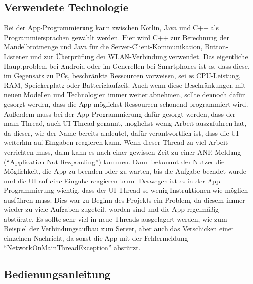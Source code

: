 \documentclass[12pt, onecolumn, notitlepage]{scrartcl}
\begin{document}
\subsection{Verwendete Technologie}
Bei der App-Programmierung kann zwischen Kotlin, Java und C++ als Programmiersprachen gewählt werden. Hier wird C++ zur Berechnung der Mandelbrotmenge und Java für die Server-Client-Kommunikation, Button-Listener und zur Überprüfung der WLAN-Verbindung verwendet. Das eigentliche Hauptproblem bei Android oder im Generellen bei Smartphones ist es, dass diese, im Gegensatz zu PCs, beschränkte Ressourcen vorweisen, sei es CPU-Leistung, RAM, Speicherplatz oder Batterielaufzeit. Auch wenn diese Beschränkungen mit neuen Modellen und Technologien immer weiter abnehmen, sollte dennoch dafür gesorgt werden, dass die App möglichst Ressourcen schonend programmiert wird. Außerdem muss bei der App-Programmierung dafür gesorgt werden, dass der main-Thread, auch UI-Thread genannt, möglichst wenig Arbeit auszuführen hat, da dieser, wie der Name bereits andeutet, dafür verantwortlich ist, dass die UI weiterhin auf Eingaben reagieren kann. Wenn dieser Thread zu viel Arbeit verrichten muss, dann kann es nach einer gewissen Zeit zu einer ANR-Meldung (\enquote{Application Not Responding}) kommen. Dann bekommt der Nutzer die Möglichkeit, die App zu beenden oder zu warten, bis die Aufgabe beendet wurde und die UI auf eine Eingabe reagieren kann. Deswegen ist es in der App-Programmierung wichtig, dass der UI-Thread so wenig Instruktionen wie möglich ausführen muss. Dies war zu Beginn des Projekts ein Problem, da diesem immer wieder zu viele Aufgaben zugeteilt worden sind und die App regelmäßig abstürzte. Es sollte sehr viel in neue Threads ausgelagert werden, wie zum Beispiel der Verbindungsaufbau zum Server, aber auch das Verschicken einer einzelnen Nachricht, da sonst die App mit der Fehlermeldung \enquote{NetworkOnMainThreadException} abstürzt.
\subsection{Bedienungsanleitung}
\end{document}
